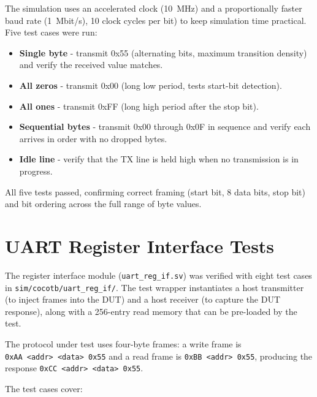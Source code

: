 The simulation uses an accelerated clock (10~MHz) and a proportionally faster baud rate (1~Mbit/s), 10 clock cycles per bit) to keep simulation time practical. Five test cases were run:

\begin{itemize}
  \item \textbf{Single byte} - transmit 0x55 (alternating bits, maximum transition density) and verify the received value matches.
  \item \textbf{All zeros} - transmit 0x00 (long low period, tests start-bit detection).
  \item \textbf{All ones} - transmit 0xFF (long high period after the stop bit).
  \item \textbf{Sequential bytes} - transmit 0x00 through 0x0F in sequence and verify each arrives in order with no dropped bytes.
  \item \textbf{Idle line} - verify that the TX line is held high when no transmission is in progress.
\end{itemize}

All five tests passed, confirming correct framing (start bit, 8 data bits, stop bit) and bit ordering across the full range of byte values.


\section{UART Register Interface Tests}

The register interface module (\texttt{uart\_reg\_if.sv}) was verified with eight test cases in \texttt{sim/cocotb/uart\_reg\_if/}. The test wrapper instantiates a host transmitter (to inject frames into the DUT) and a host receiver (to capture the DUT response), along with a 256-entry read memory that can be pre-loaded by the test.

The protocol under test uses four-byte frames: a write frame is \\
\texttt{0xAA~<addr>~<data>~0x55} and a read frame is \texttt{0xBB~<addr>~0x55}, producing the response \texttt{0xCC~<addr>~<data>~0x55}.

The test cases cover:

